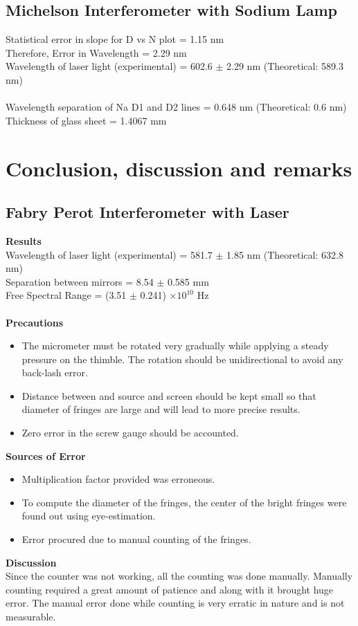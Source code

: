 \documentclass[12pt]{report}
\begin{document}
	\section{Michelson Interferometer with Sodium Lamp}
	Statistical error in slope for D vs N plot = 1.15 nm\\
	Therefore, Error in Wavelength = 2.29 nm\\
	Wavelength of laser light (experimental) = 602.6 $\pm$ 2.29 nm (Theoretical: 589.3 nm)\\ \\
	Wavelength separation of Na D1 and D2 lines = 0.648 nm (Theoretical: 0.6 nm)\\
	Thickness of glass sheet = 1.4067 mm \\
	
	
	\chapter{Conclusion, discussion and remarks}
	\section{Fabry Perot Interferometer with Laser}
	\textbf{Results}\\
	Wavelength of laser light (experimental) = 581.7 $\pm$ 1.85 nm (Theoretical: 632.8 nm)\\
	Separation between mirrors = 8.54 $\pm$ 0.585 mm\\
	Free Spectral Range = (3.51 $\pm$ 0.241) $\times10^{10}$ Hz\\ \\
	\textbf{Precautions}
	\begin{itemize}
		\item The micrometer must be rotated very gradually while applying a steady pressure
		on the thimble. The rotation should be unidirectional to avoid any back-lash error.  
		\item Distance between and source and screen should be kept small so that diameter of fringes are large and will lead to more precise results. 
		\item Zero error in the screw gauge should be accounted.
	\end{itemize}
	\textbf{Sources of Error}
	\begin{itemize}
		\item Multiplication factor provided was erroneous. 
		\item To compute the diameter of the fringes, the center of the bright fringes were found out using eye-estimation. 
		\item Error procured due to manual counting of the fringes. 
	\end{itemize}
	\textbf{Discussion}\\
	Since the counter was not working, all the counting was done manually. Manually counting required a great amount of patience and along with it brought huge error. The manual error done while counting is very erratic in nature and is not measurable. \\
	
\end{document}
